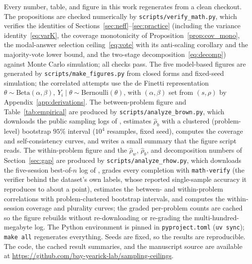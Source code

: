 \documentclass[11pt]{article}
\begin{document}
Every number, table, and figure in this work regenerates from a clean checkout. The propositions are checked numerically by \texttt{scripts/verify\_math.py}, which verifies the identities of Sections~\ref{sec:neff}--\ref{sec:practice} (including the variance identity~\eqref{eq:varK}, the coverage monotonicity of Proposition~\ref{prop:cov_mono}, the modal-answer selection ceiling~\eqref{eq:vote} with its anti-scaling corollary and the majority-vote lower bound, and the two-stage decomposition~\eqref{eq:decomp}) against Monte Carlo simulation; all checks pass. The five model-based figures are generated by \texttt{scripts/make\_figures.py} from closed forms and fixed-seed simulation; the correlated attempts use the de Finetti representation $\theta\sim\mathrm{Beta}(\alpha,\beta)$, $Y_i\mid\theta\sim\text{Bernoulli}(\theta)$, with $(\alpha,\beta)$ set from $(s,\rho)$ by Appendix~\ref{app:derivations}. The between-problem figure and Table~\ref{tab:empirical} are produced by \texttt{scripts/analyze\_brown.py}, which downloads the public sampling logs of \citet{brown2024monkeys}, estimates $\hat\rho_b$ with a clustered (problem-level) bootstrap $95\%$ interval ($10^4$ resamples, fixed seed), computes the coverage and self-consistency curves, and writes a small summary that the figure script reads. The within-problem figure and the $\hat\rho_w$, $\hat\rho_b$, and decomposition numbers of Section~\ref{sec:gap} are produced by \texttt{scripts/analyze\_rhow.py}, which downloads the five-session best-of-$n$ log of \citet{beeching2024scaling}, grades every completion with \texttt{math-verify} (the verifier behind the dataset's own labels, whose reported single-sample accuracy it reproduces to about a point), estimates the between- and within-problem correlations with problem-clustered bootstrap intervals, and computes the within-session coverage and plurality curves; the graded per-problem counts are cached so the figure rebuilds without re-downloading or re-grading the multi-hundred-megabyte log. The Python environment is pinned in \texttt{pyproject.toml} (\texttt{uv sync}); \texttt{make all} regenerates everything. Seeds are fixed, so the results are reproducible. The code, the cached result summaries, and the manuscript source are available at \url{https://github.com/bay-yearick-lab/sampling-ceilings}.
\end{document}
